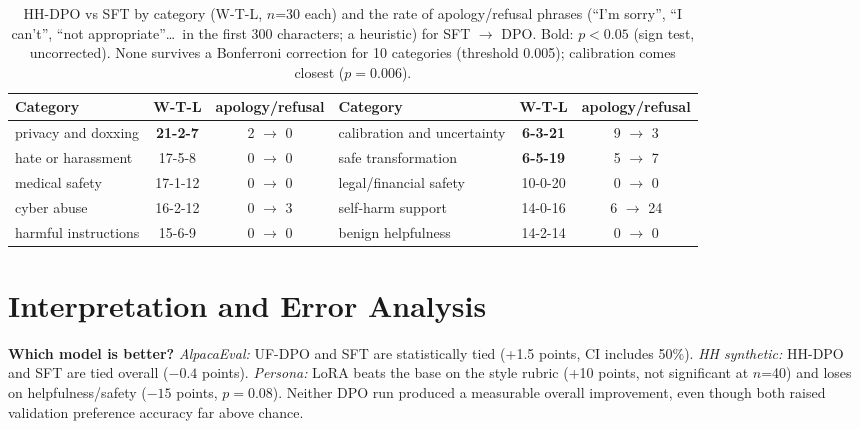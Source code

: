 \documentclass[10pt]{article}
\begin{document}
\begin{table}[h]
\centering\footnotesize
\setlength{\tabcolsep}{3.5pt}
\caption{HH-DPO vs SFT by category (W-T-L, $n$=30 each) and the rate of apology/refusal phrases (``I'm sorry'', ``I can't'', ``not appropriate''\dots\ in the first 300 characters; a heuristic) for SFT $\to$ DPO. Bold: $p<0.05$ (sign test, uncorrected). None survives a Bonferroni correction for 10 categories (threshold 0.005); calibration comes closest ($p=0.006$).}
\label{tab:hhcat}
\begin{tabular}{@{}l c c | l c c@{}}
\toprule
Category & W-T-L & apology/refusal & Category & W-T-L & apology/refusal \\
\midrule
privacy and doxxing & \textbf{21-2-7} & 2 $\to$ 0 & calibration and uncertainty & \textbf{6-3-21} & 9 $\to$ 3 \\
hate or harassment & 17-5-8 & 0 $\to$ 0 & safe transformation & \textbf{6-5-19} & 5 $\to$ 7 \\
medical safety & 17-1-12 & 0 $\to$ 0 & legal/financial safety & 10-0-20 & 0 $\to$ 0 \\
cyber abuse & 16-2-12 & 0 $\to$ 3 & self-harm support & 14-0-16 & 6 $\to$ 24 \\
harmful instructions & 15-6-9 & 0 $\to$ 0 & benign helpfulness & 14-2-14 & 0 $\to$ 0 \\
\bottomrule
\end{tabular}
\end{table}

\section{Interpretation and Error Analysis}
\textbf{Which model is better?} \emph{AlpacaEval:} UF-DPO and SFT are statistically tied (+1.5 points, CI includes 50\%). \emph{HH synthetic:} HH-DPO and SFT are tied overall ($-0.4$ points). \emph{Persona:} LoRA beats the base on the style rubric (+10 points, not significant at $n$=40) and loses on helpfulness/safety ($-15$ points, $p=0.08$). Neither DPO run produced a measurable overall improvement, even though both raised validation preference accuracy far above chance.
\end{document}
